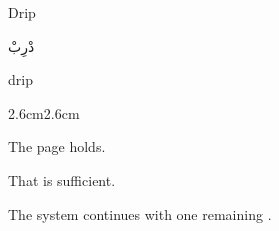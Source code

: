 \begin{center}

Drip

\vspace{1em}

{\AmiriFont دْرِبْ}

\vspace{1em}

drip

\end{center}

\vspace{3em}

\begin{adjustwidth}{2.6cm}{2.6cm}

The page holds.

\vspace{1em}

That is sufficient.

\vspace{3em}

\end{adjustwidth}

\begin{center}
The system continues with one remaining .
\end{center}
